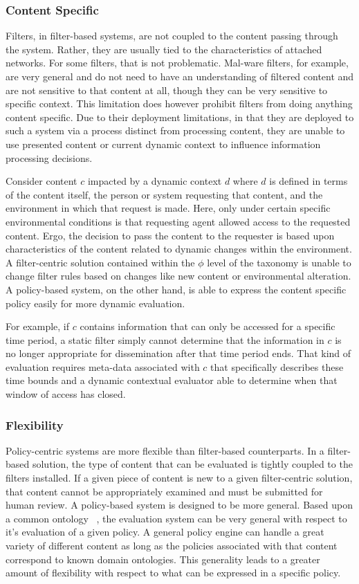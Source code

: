 \subsubsection*{Content Specific}
Filters, in filter-based systems, are not coupled to the content passing through the system.  Rather, they are usually tied to the characteristics of attached networks.  For some filters, that is not problematic.  Mal-ware filters, for example, are very general and do not need to have an understanding of filtered content and are not sensitive to that content at all, though they can be very sensitive to specific context.  This limitation does however prohibit filters from doing anything content specific.  Due to their deployment limitations, in that they are deployed to such a system via a process distinct from processing content, they are unable to use presented content or current dynamic context to influence information processing decisions.

Consider content $c$ impacted by a dynamic context $d$ where $d$ is defined in terms of the content itself, the person or system requesting that content, and the environment in which that request is made.  Here, only under certain specific environmental conditions is that requesting agent allowed access to the requested content.  Ergo, the decision to pass the content to the requester is based upon characteristics of the content related to dynamic changes within the environment.  A filter-centric solution contained within the $\phi$ level of the taxonomy is unable to change filter rules based on changes like new content or environmental alteration.  A policy-based system, on the other hand, is able to express the content specific policy easily for more dynamic evaluation.

For example, if $c$ contains information that can only be accessed for a specific time period, a static filter simply cannot determine that the information in $c$ is no longer appropriate for dissemination after that time period ends.  That kind of evaluation requires meta-data associated with $c$ that specifically describes these time bounds and a dynamic contextual evaluator able to determine when that window of access has closed.

\subsubsection*{Flexibility}
Policy-centric systems are more flexible than filter-based counterparts.  In a filter-based solution, the type of content that can be evaluated is tightly coupled to the filters installed.  If a given piece of content is new to a given filter-centric solution, that content cannot be appropriately examined and must be submitted for human review.  A policy-based system is designed to be more general.  Based upon a common ontology ~\cite{JaHeLa:10}, the evaluation system can be very general with respect to it's evaluation of a given policy.  A general policy engine can handle a great variety of different content as long as the policies associated with that content correspond to known domain ontologies.  This generality leads to a greater amount of flexibility with respect to what can be expressed in a specific policy.

